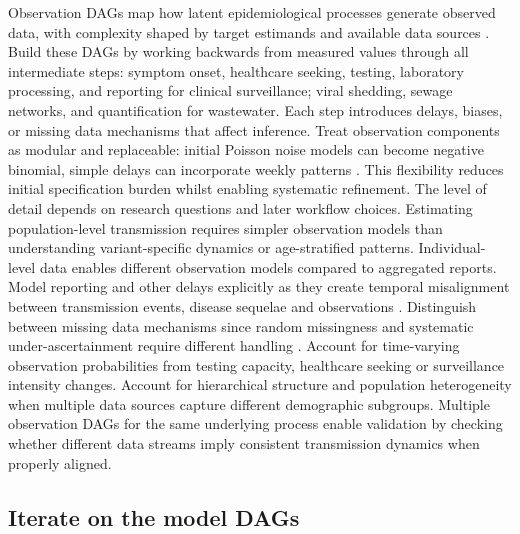 \documentclass{article}
\begin{document}
Observation DAGs map how latent epidemiological processes generate observed data, with complexity shaped by target estimands and available data sources \citep{deangelis2018analysing}.
Build these DAGs by working backwards from measured values through all intermediate steps: symptom onset, healthcare seeking, testing, laboratory processing, and reporting for clinical surveillance; viral shedding, sewage networks, and quantification for wastewater.
Each step introduces delays, biases, or missing data mechanisms that affect inference.
Treat observation components as modular and replaceable: initial Poisson noise models can become negative binomial, simple delays can incorporate weekly patterns \citep{gelman2020bayesian}.
This flexibility reduces initial specification burden whilst enabling systematic refinement.
The level of detail depends on research questions and later workflow choices.
Estimating population-level transmission requires simpler observation models than understanding variant-specific dynamics or age-stratified patterns.
Individual-level data enables different observation models compared to aggregated reports.
Model reporting and other delays explicitly as they create temporal misalignment between transmission events, disease sequelae and observations \citep{seaman2022nowcasting}.
Distinguish between missing data mechanisms since random missingness and systematic under-ascertainment require different handling \citep{sherratt2021exploring}.
Account for time-varying observation probabilities from testing capacity, healthcare seeking or surveillance intensity changes.
Account for hierarchical structure and population heterogeneity when multiple data sources capture different demographic subgroups.
Multiple observation DAGs for the same underlying process enable validation by checking whether different data streams imply consistent transmission dynamics when properly aligned.

\subsection{Iterate on the model DAGs}
\end{document}
